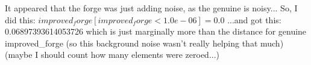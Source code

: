 It appeared that the forge was just adding noise, as the genuine is noisy...
So, I did this:
$improved_forge[improved_forge < 1.0e-06] = 0.0$
...and got this:
0.06897393614053726
which is just marginally more than the distance for genuine improved\_forge
(so this background noise wasn't really helping that much)
(maybe I should count how many elements were zeroed...)












